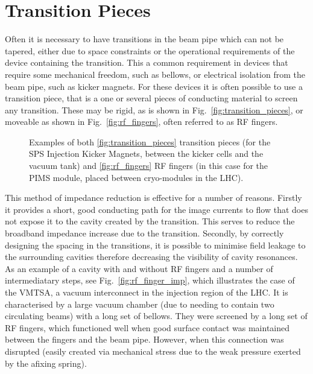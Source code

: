 \section{Transition Pieces}
\label{sec:transitions}

Often it is necessary to have transitions in the beam pipe which can not be tapered, either due to space constraints or the operational requirements of the device containing the transition. This a common requirement in devices that require some mechanical freedom, such as bellows, or electrical isolation from the beam pipe, such as kicker magnets. For these devices it is often possible to use a transition piece, that is a one or several pieces of conducting material to screen any transition. These may be rigid, as is shown in Fig.~\ref{fig:transition_pieces}, or moveable as shown in Fig.~\ref{fig:rf_fingers}, often referred to as RF fingers.

\begin{figure}
\subfigure[]{

\label{fig:transition_pieces}
}
\subfigure[]{

\label{fig:rf_fingers}
}

\label{fig:transition_pieces_geo}
\caption{Examples of both \ref{fig:transition_pieces} transition pieces (for the SPS Injection Kicker Magnets, between the kicker cells and the vacuum tank) and \ref{fig:rf_fingers} RF fingers (in this case for the PIMS module, placed between cryo-modules in the LHC).}
\end{figure}


This method of impedance reduction is effective for a number of reasons. Firstly it provides a short, good conducting path for the image currents to flow that does not expose it to the cavity created by the transition. This serves to reduce the broadband impedance increase due to the transition. Secondly, by correctly designing the spacing in the transitions, it is possible to minimise field leakage to the surrounding cavities therefore decreasing the visibility of cavity resonances. As an example of a cavity with and without RF fingers and a number of intermediatary steps, see Fig.~\ref{fig:rf_finger_imp}, which illustrates the case of the VMTSA, a vacuum interconnect in the injection region of the LHC. It is characterised by a large vacuum chamber (due to needing to contain two circulating beams) with a long set of bellows. They were screened by a long set of RF fingers, which functioned well when good surface contact was maintained between the fingers and the beam pipe. However, when this connection was disrupted (easily created via mechanical stress due to the weak pressure exerted by the afixing spring).


